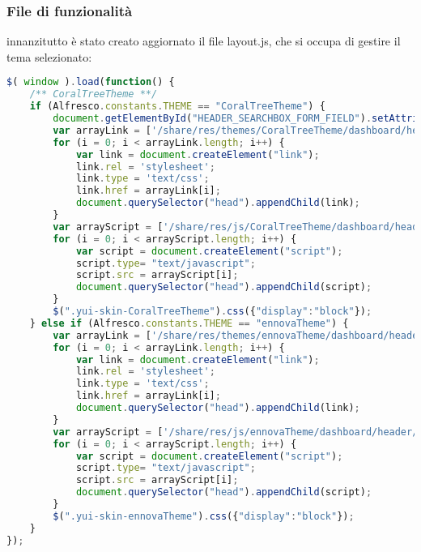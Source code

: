 \subsubsection{File di funzionalità}
innanzitutto è stato creato aggiornato il file layout.js, che si occupa di gestire il tema selezionato:
\begin{lstlisting}[language=JavaScript]
$( window ).load(function() {
    /** CoralTreeTheme **/
    if (Alfresco.constants.THEME == "CoralTreeTheme") {
        document.getElementById("HEADER_SEARCHBOX_FORM_FIELD").setAttribute("placeholder","Chi cerca, trova!");
        var arrayLink = ['/share/res/themes/CoralTreeTheme/dashboard/header/header.css', '/share/res/themes/CoralTreeTheme/dashboard/footer/footer.css'];
        for (i = 0; i < arrayLink.length; i++) {
            var link = document.createElement("link");
            link.rel = 'stylesheet';
            link.type = 'text/css';
            link.href = arrayLink[i];
            document.querySelector("head").appendChild(link);
        }
        var arrayScript = ['/share/res/js/CoralTreeTheme/dashboard/header/header.js', '/share/res/js/CoralTreeTheme/dashboard/footer/footer.js'];
        for (i = 0; i < arrayScript.length; i++) {
            var script = document.createElement("script");
            script.type= "text/javascript";
            script.src = arrayScript[i];
            document.querySelector("head").appendChild(script);
        }
        $(".yui-skin-CoralTreeTheme").css({"display":"block"});
    } else if (Alfresco.constants.THEME == "ennovaTheme") {
        var arrayLink = ['/share/res/themes/ennovaTheme/dashboard/header/header.css', '/share/res/themes/ennovaTheme/dashboard/footer/footer.css'];
        for (i = 0; i < arrayLink.length; i++) {
            var link = document.createElement("link");
            link.rel = 'stylesheet';
            link.type = 'text/css';
            link.href = arrayLink[i];
            document.querySelector("head").appendChild(link);
        }
        var arrayScript = ['/share/res/js/ennovaTheme/dashboard/header/header.js', '/share/res/js/ennovaTheme/dashboard/footer/footer.js'];
        for (i = 0; i < arrayScript.length; i++) {
            var script = document.createElement("script");
            script.type= "text/javascript";
            script.src = arrayScript[i];
            document.querySelector("head").appendChild(script);
        }
        $(".yui-skin-ennovaTheme").css({"display":"block"});
    }
});
\end{lstlisting}
